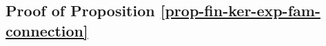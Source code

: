 \documentclass[12pt]{article}
\theoremstyle{definition}
\theoremstyle{theorem}
\newtheorem{proposition}{Proposition}
\theoremstyle{remark}
\begin{document}
%
%
%
%

\subsection{Proof of Proposition \ref{prop-fin-ker-exp-fam-connection}}\label{subsection-proof-prop-fin-ker-exp-fam-connection}
\end{document}
